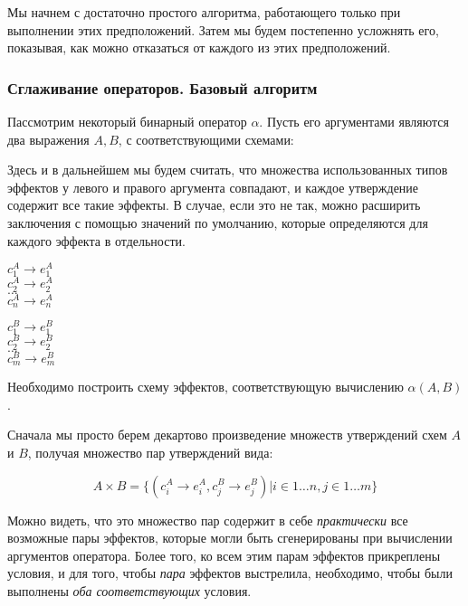 Мы начнем с достаточно простого алгоритма, работающего только при выполнении этих предположений. Затем мы будем постепенно усложнять его, показывая, как можно отказаться от каждого из этих предположений.




\subsubsection{Сглаживание операторов. Базовый алгоритм}

Пассмотрим некоторый бинарный оператор $\alpha$. Пусть его аргументами являются два выражения $A, B$, с соответствующими схемами:

Здесь и в дальнейшем мы будем считать, что множества использованных типов эффектов у левого и правого аргумента совпадают, и каждое утверждение содержит все такие эффекты. В случае, если это не так, можно расширить заключения с помощью значений по умолчанию, которые определяются для каждого эффекта в отдельности.

{
    $c^A_1 \rightarrow e^A_1$ \\
    $c^A_2 \rightarrow e^A_2$ \\
    $\ldots$ \\
    $c^A_n \rightarrow e^A_n$ \\
}{}

\bigskip

{
    $c^B_1 \rightarrow e^B_1$ \\
    $c^B_2 \rightarrow e^B_2$ \\
    $\ldots$ \\
    $c^B_m \rightarrow e^B_m$ \\        
}{}

Необходимо построить схему эффектов, соответствующую вычислению $\alpha(A, B)$. 



Сначала мы просто берем декартово произведение множеств утверждений схем $A$ и $B$, получая множество пар утверждений вида: 

$$A \times B = \big\{ (c^A_i \rightarrow e^A_i, c^B_j \rightarrow e^B_j) \rvert i \in 1 \ldots n, j \in 1 \ldots m \big\}$$

Можно видеть, что это множество пар содержит в себе \emph{практически} все возможные пары эффектов, которые могли быть сгенерированы при вычислении аргументов оператора. Более того, ко всем этим парам эффектов прикреплены условия, и для того, чтобы \emph{пара} эффектов выстрелила, необходимо, чтобы были выполнены \emph{оба соответствующих} условия. 

